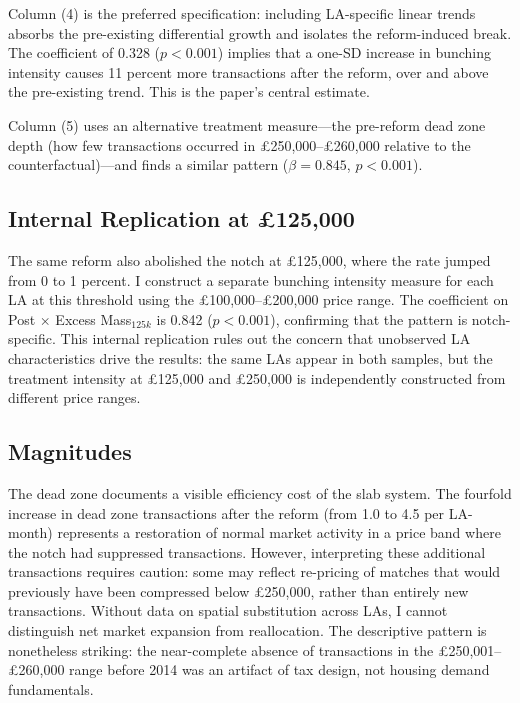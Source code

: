 \documentclass[12pt]{article}
\begin{document}
Column (4) is the preferred specification: including LA-specific linear trends absorbs the pre-existing differential growth and isolates the reform-induced break. The coefficient of 0.328 ($p < 0.001$) implies that a one-SD increase in bunching intensity causes 11 percent more transactions after the reform, over and above the pre-existing trend. This is the paper's central estimate.

Column (5) uses an alternative treatment measure---the pre-reform dead zone depth (how few transactions occurred in \pounds250,000--\pounds260,000 relative to the counterfactual)---and finds a similar pattern ($\beta = 0.845$, $p < 0.001$).

\subsection{Internal Replication at \pounds125,000}

The same reform also abolished the notch at \pounds125,000, where the rate jumped from 0 to 1 percent. I construct a separate bunching intensity measure for each LA at this threshold using the \pounds100,000--\pounds200,000 price range. The coefficient on Post $\times$ Excess Mass$_{125k}$ is 0.842 ($p < 0.001$), confirming that the pattern is notch-specific. This internal replication rules out the concern that unobserved LA characteristics drive the results: the same LAs appear in both samples, but the treatment intensity at \pounds125,000 and \pounds250,000 is independently constructed from different price ranges.

\subsection{Magnitudes}

The dead zone documents a visible efficiency cost of the slab system. The fourfold increase in dead zone transactions after the reform (from 1.0 to 4.5 per LA-month) represents a restoration of normal market activity in a price band where the notch had suppressed transactions. However, interpreting these additional transactions requires caution: some may reflect re-pricing of matches that would previously have been compressed below \pounds250,000, rather than entirely new transactions. Without data on spatial substitution across LAs, I cannot distinguish net market expansion from reallocation. The descriptive pattern is nonetheless striking: the near-complete absence of transactions in the \pounds250,001--\pounds260,000 range before 2014 was an artifact of tax design, not housing demand fundamentals.
\end{document}
